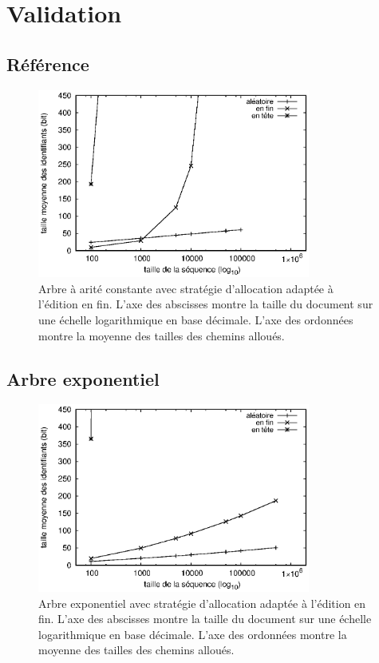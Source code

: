 
\section{Validation}
\label{repl:sec:validation}


\subsection{Référence}

\begin{figure}
  \begin{center}
    \includegraphics[width=0.8\textwidth]{img/lseq/logoot.eps}
    \caption{\label{repl:img:logoot} Arbre à arité constante avec stratégie
      d'allocation adaptée à l'édition en fin. L'axe des abscisses montre la
      taille du document sur une échelle logarithmique en base décimale. L'axe
      des ordonnées montre la moyenne des tailles des chemins alloués.}
  \end{center}
\end{figure}


\subsection{Arbre exponentiel}

\begin{figure}
  \centering
  \includegraphics[width=0.8\textwidth]{img/lseq/double.eps}
  \caption{\label{repl:img:exponentialtree} Arbre exponentiel avec stratégie
    d'allocation adaptée à l'édition en fin. L'axe des abscisses montre la
    taille du document sur une échelle logarithmique en base décimale. L'axe des
    ordonnées montre la moyenne des tailles des chemins alloués.}
\end{figure}

